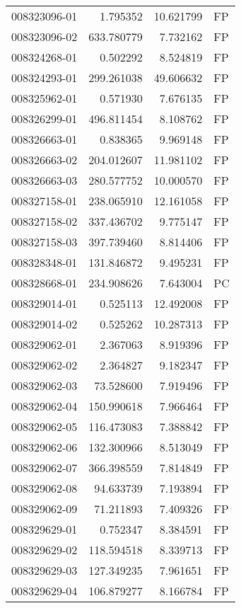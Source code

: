 \begin{tabular}{lrrl}
008323096-01 &    1.795352 &    10.621799 &   FP \\
008323096-02 &  633.780779 &     7.732162 &   FP \\
008324268-01 &    0.502292 &     8.524819 &   FP \\
008324293-01 &  299.261038 &    49.606632 &   FP \\
008325962-01 &    0.571930 &     7.676135 &   FP \\
008326299-01 &  496.811454 &     8.108762 &   FP \\
008326663-01 &    0.838365 &     9.969148 &   FP \\
008326663-02 &  204.012607 &    11.981102 &   FP \\
008326663-03 &  280.577752 &    10.000570 &   FP \\
008327158-01 &  238.065910 &    12.161058 &   FP \\
008327158-02 &  337.436702 &     9.775147 &   FP \\
008327158-03 &  397.739460 &     8.814406 &   FP \\
008328348-01 &  131.846872 &     9.495231 &   FP \\
008328668-01 &  234.908626 &     7.643004 &   PC \\
008329014-01 &    0.525113 &    12.492008 &   FP \\
008329014-02 &    0.525262 &    10.287313 &   FP \\
008329062-01 &    2.367063 &     8.919396 &   FP \\
008329062-02 &    2.364827 &     9.182347 &   FP \\
008329062-03 &   73.528600 &     7.919496 &   FP \\
008329062-04 &  150.990618 &     7.966464 &   FP \\
008329062-05 &  116.473083 &     7.388842 &   FP \\
008329062-06 &  132.300966 &     8.513049 &   FP \\
008329062-07 &  366.398559 &     7.814849 &   FP \\
008329062-08 &   94.633739 &     7.193894 &   FP \\
008329062-09 &   71.211893 &     7.409326 &   FP \\
008329629-01 &    0.752347 &     8.384591 &   FP \\
008329629-02 &  118.594518 &     8.339713 &   FP \\
008329629-03 &  127.349235 &     7.961651 &   FP \\
008329629-04 &  106.879277 &     8.166784 &   FP \\

\end{tabular}
